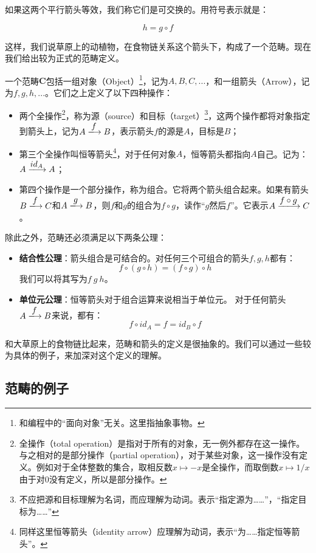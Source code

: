 \documentclass{article}
\begin{document}
如果这两个平行箭头等效，我们称它们是可交换的。用符号表示就是：

\[
h = g \circ f
\]

这样，我们说草原上的动植物，在食物链关系这个箭头下，构成了一个范畴。现在我们给出较为正式的范畴定义。

 
\begin{definition}
一个范畴$\pmb{C}$包括一组对象（Object）\footnote{和编程中的“面向对象”无关。这里指抽象事物。}，记为$A, B, C, ...$，和一组箭头（Arrow），记为$f, g, h, ...$。它们之上定义了以下四种操作：
\begin{itemize}
\item 两个全操作\footnote{全操作（total operation）是指对于所有的对象，无一例外都存在这一操作。与之相对的是部分操作（partial operation），对于某些对象，这一操作没有定义。例如对于全体整数的集合，取相反数$x \mapsto -x$是全操作，而取倒数$x \mapsto 1/x$由于对0没有定义，所以是部分操作。}，称为源（source）和目标（target）\footnote{不应把源和目标理解为名词，而应理解为动词。表示“指定源为……”，“指定目标为……”}，这两个操作都将对象指定到箭头上，记为$A \arrowto{f} B$，表示箭头$f$的源是$A$，目标是$B$；
\item 第三个全操作叫恒等箭头\footnote{同样这里恒等箭头（identity arrow）应理解为动词，表示“为……指定恒等箭头”。}，对于任何对象$A$，恒等箭头都指向$A$自己。记为：$A \arrowto{id_A} A$；
\item 第四个操作是一个部分操作，称为组合。它将两个箭头组合起来。如果有箭头$B \arrowto{f} C$和$A \arrowto{g} B$，则$f$和$g$的组合为$f \circ g$，读作“$g$然后$f$”。它表示$A \arrowto{f \circ g} C$。
\end{itemize}

除此之外，范畴还必须满足以下两条公理：

\begin{itemize}
\item \textbf{结合性公理}：箭头组合是可结合的。对任何三个可组合的箭头$f, g, h$都有：
\[
f \circ (g \circ h) = (f \circ g) \circ h
\]
我们可以将其写为$f\ g\ h$。
\item \textbf{单位元公理}：恒等箭头对于组合运算来说相当于单位元。
对于任何箭头$A \arrowto{f} B$来说，都有：
\[
f \circ id_A = f = id_B \circ f
\]
\end{itemize}
\end{definition}

和大草原上的食物链比起来，范畴和箭头的定义是很抽象的。我们可以通过一些较为具体的例子，来加深对这个定义的理解。

\subsection{范畴的例子}
\end{document}
